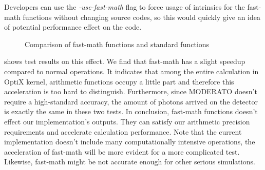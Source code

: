 Developers can use the \textit{-use-fast-math} flag to force usage of intrinsics for the fast-math functions without changing source codes, so this would quickly give an idea of potential performance effect on the code.
\begin{figure}
\centering
{}
\caption{Comparison of fast-math functions and standard functions}
\label{fig:compa}
\end{figure}

 shows test results on this effect. We find that fast-math has a slight speedup compared to normal operations. It indicates that among the entire calculation in OptiX kernel, arithmetic functions occupy a little part and therefore this acceleration is too hard to distinguish. Furthermore, since MODERATO doesn't require a high-standard accuracy, the amount of photons arrived on the detector is exactly the same in these two tests. In conclusion, fast-math functions doesn't effect our implementation's outputs. They can satisfy our arithmetic precision requirements and accelerate calculation performance. Note that the current implementation doesn't include many computationally intensive operations, the acceleration of fast-math will be more evident for a more complicated test. Likewise, fast-math might be not accurate enough for other serious simulations.


